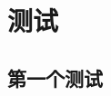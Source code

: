 \documentclass[forprint]{WHUBachelor}
\begin{document}
\cleardoublepage{}
{}
\begin{thebibliography}{00}
\end{thebibliography}



\appendix

\chapter{测试}

\section{第一个测试}

\cleardoublepage
\end{document}
